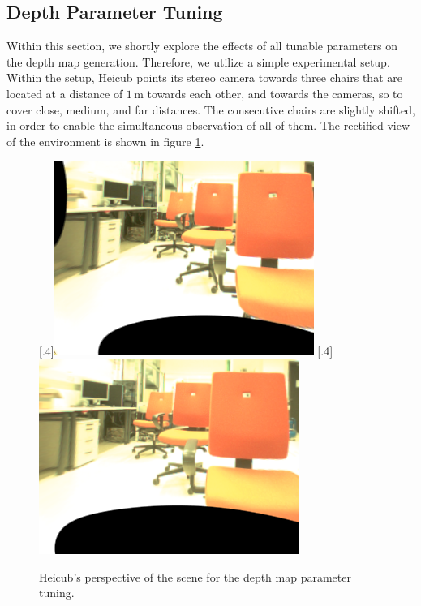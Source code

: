 \subsection{Depth Parameter Tuning}
Within this section, we shortly explore the effects of all tunable parameters on the depth map generation. Therefore, we utilize a simple experimental setup.
Within the setup, Heicub points its stereo camera towards three chairs that are located at a distance of $1\,\text{m}$ towards each other, and towards the cameras, so to cover close, medium, and far distances. The consecutive chairs are slightly shifted, in order to enable the simultaneous observation of all of them. The rectified view of the environment is shown in figure \ref{fig::522_wls_rgb}.
\begin{figure}[h]
	\centering
	[.4\linewidth]{\includegraphics[scale=.3]{chapters/05_experiments/02_autonomous_walking/02_depth_map_parameter_tuning/l_rgb.png}}
	[.4\linewidth]{\includegraphics[scale=.3]{chapters/05_experiments/02_autonomous_walking/02_depth_map_parameter_tuning/r_rgb.png}}
	\caption{Heicub's perspective of the scene for the depth map parameter tuning.}
	\label{fig::522_wls_rgb}
\end{figure}
